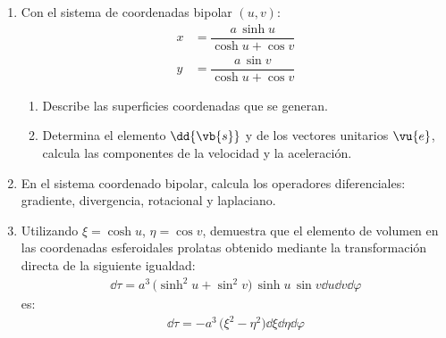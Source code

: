 \begin{enumerate}
\item Con el sistema de coordenadas bipolar $(u, v)$:
\begin{align*}
x &= \dfrac{a \, \sinh u}{\cosh u + \cos v} \\[0.5em]
y &= \dfrac{a \, \sin v}{\cosh u + \cos v}
\end{align*}
\begin{enumerate}[label=\alph*)]
\item Describe las superficies coordenadas que se generan.
\item \label{inciso_1_b} Determina el elemento $\dd{\vb{s}}$ y de los vectores unitarios $\vu{e}$, calcula las componentes de la velocidad y la aceleración.
\end{enumerate}
\item En el sistema coordenado bipolar, calcula los operadores diferenciales: gradiente, divergencia, rotacional y laplaciano.
\item Utilizando $\xi = \cosh u$, $\eta = \cos v$, demuestra que el elemento de volumen en las coordenadas esferoidales prolatas obtenido mediante la transformación directa de la siguiente igualdad:
\begin{align*}
\dd{\tau} = a^{3} \, \big( \sinh^{2} u + \sin^{2} v \big) \, \sinh u \, \sin v \dd{u} \dd{v} \dd{\varphi}
\end{align*}
es:
\begin{align*}
\dd{\tau} = - a^{3} \, \big( \xi^{2} - \eta^{2} \big) \dd{\xi} \dd{\eta} \dd{\varphi}
\end{align*}

\end{enumerate}
